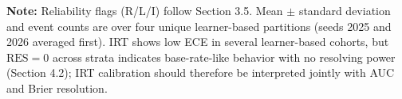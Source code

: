 \begin{table}[htbp]
{\begin{tabular}{lllrcccccc}
\end{tabular}%
}

\vspace{1ex}
{\scriptsize \textbf{Note:} Reliability flags (R/L/I) follow Section 3.5. Mean $\pm$ standard deviation and event counts are over four unique learner-based partitions (seeds 2025 and 2026 averaged first). IRT shows low ECE in several learner-based cohorts, but $\text{RES} = 0$ across strata indicates base-rate-like behavior with no resolving power (Section 4.2); IRT calibration should therefore be interpreted jointly with AUC and Brier resolution.\par}

\end{table}
